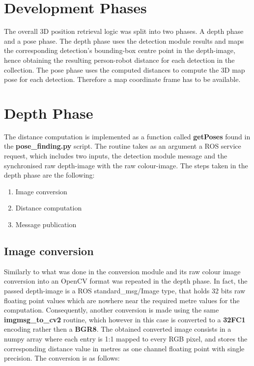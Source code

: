 \section{Development Phases}

The overall 3D position retrieval logic was split into two phases. A depth phase and a pose phase. The depth phase uses the detection module results and maps the corresponding detection's bounding-box centre point in the depth-image, hence obtaining the resulting person-robot distance for each detection in the collection. The pose phase uses the computed distances to compute the 3D map pose for each detection. Therefore a map coordinate frame has to be available.

\section{Depth Phase}

The distance computation is implemented as a function called \textbf{getPoses} found in the \textbf{pose\_finding.py} script. The routine takes as an argument a ROS service request, which includes two inputs, the detection module message and the synchronised raw depth-image with the raw colour-image. The steps taken in the depth phase are the following:

\begin{enumerate}
  \item Image conversion
  \item Distance computation
  \item Message publication
\end{enumerate}

\subsection{Image conversion}

Similarly to what was done in the conversion module and its raw colour image conversion into an OpenCV format was repeated in the depth phase. In fact, the passed depth-image is a ROS standard\_msg/Image type, that holds 32 bits raw floating point values which are nowhere near the required metre values for the computation. Consequently, another conversion is made using the same \textbf{imgmsg\_to\_cv2} routine, which however in this case is converted to a \textbf{32FC1} encoding rather then a \textbf{BGR8}. The obtained converted image consists in a numpy array where each entry is 1:1 mapped to every RGB pixel, and stores the corresponding distance value in metres as one channel floating point with single precision. The conversion is as follows:

